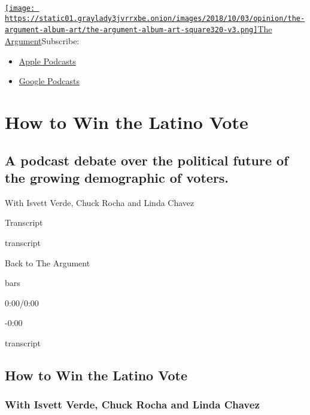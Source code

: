 \href{https://www.nytimes3xbfgragh.onion/column/the-argument}{\texttt{[image: https://static01.graylady3jvrrxbe.onion/images/2018/10/03/opinion/the-argument-album-art/the-argument-album-art-square320-v3.png]}The
Argument}Subscribe:

\begin{itemize}
\tightlist
\item
  \href{https://itunes.apple.com/us/podcast/id1438024613}{Apple
  Podcasts}
\item
  \href{https://www.google.com/podcasts?feed=aHR0cHM6Ly9yc3MuYXJ0MTkuY29tL3RoZS1hcmd1bWVudA\%3D\%3D}{Google
  Podcasts}
\end{itemize}

\hypertarget{how-to-win-the-latino-vote-1}{%
\section{How to Win the Latino
Vote}\label{how-to-win-the-latino-vote-1}}

\hypertarget{a-podcast-debate-over-the-political-future-of-the-growing-demographic-of-voters-1}{%
\subsection{A podcast debate over the political future of the growing
demographic of
voters.}\label{a-podcast-debate-over-the-political-future-of-the-growing-demographic-of-voters-1}}

With Isvett Verde, Chuck Rocha and Linda Chavez

Transcript

transcript

Back to The Argument

bars

0:00/0:00

-0:00

transcript

\hypertarget{how-to-win-the-latino-vote-2}{%
\subsection{How to Win the Latino
Vote}\label{how-to-win-the-latino-vote-2}}

\hypertarget{with-isvett-verde-chuck-rocha-and-linda-chavez-1}{%
\subsubsection{With Isvett Verde, Chuck Rocha and Linda
Chavez}\label{with-isvett-verde-chuck-rocha-and-linda-chavez-1}}

